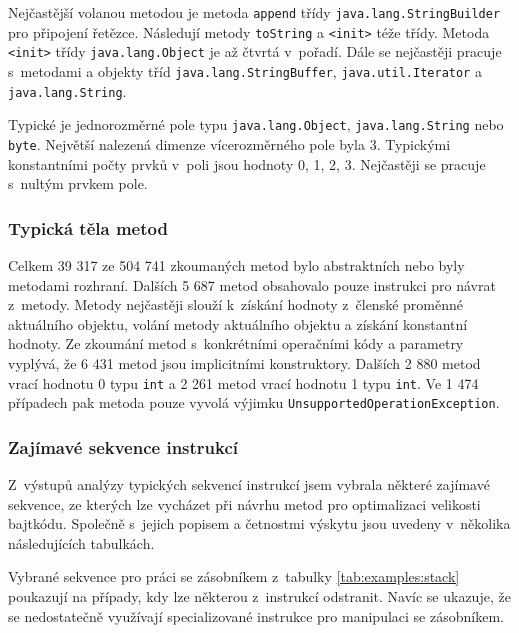 Nejčastější volanou metodou je metoda \texttt{append} třídy \texttt{java.lang.StringBuilder} pro připojení řetězce. Následují metody \texttt{toString} a \texttt{<init>} téže třídy. Metoda \texttt{<init>} třídy \texttt{java.lang.Object} je až čtvrtá v~pořadí. Dále se nejčastěji pracuje s~metodami a objekty tříd \texttt{java.lang.StringBuffer}, \texttt{java.util.Iterator} a \texttt{java.lang.String}.

Typické je jednorozměrné pole typu \texttt{java.lang.Object}, \texttt{java.lang.String} nebo \texttt{byte}. Největší nalezená dimenze vícerozměrného pole byla 3. Typickými konstantními počty prvků v~poli jsou hodnoty 0, 1, 2, 3. Nejčastěji se pracuje s~nultým prvkem pole.

\subsubsection{Typická těla metod}

Celkem 39 317 ze 504 741 zkoumaných metod bylo abstraktních nebo byly metodami rozhraní. Dalších 5 687 metod obsahovalo pouze instrukci pro návrat z~metody. Metody nejčastěji slouží k~získání hodnoty z~členské proměnné aktuálního objektu, volání metody aktuálního objektu a získání konstantní hodnoty. Ze zkoumání metod s~konkrétními operačními kódy a parametry vyplývá, že 6 431 metod jsou implicitními konstruktory. Dalších 2 880 metod vrací hodnotu 0 typu \texttt{int} a 2 261 metod vrací hodnotu 1 typu \texttt{int}. Ve 1 474 případech pak metoda pouze vyvolá výjimku \texttt{UnsupportedOperationException}.


\subsubsection{Zajímavé sekvence instrukcí}

Z~výstupů analýzy typických sekvencí instrukcí jsem vybrala některé zajímavé sekvence, ze kterých lze vycházet při návrhu metod pro optimalizaci velikosti bajtkódu. Společně s~jejich popisem a četnostmi výskytu jsou uvedeny v~několika následujících tabulkách.

Vybrané sekvence pro práci se zásobníkem z~tabulky \ref{tab:examples:stack} poukazují na případy, kdy lze některou z~instrukcí odstranit. Navíc se ukazuje, že se nedostatečně využívají specializované instrukce pro manipulaci se zásobníkem.

